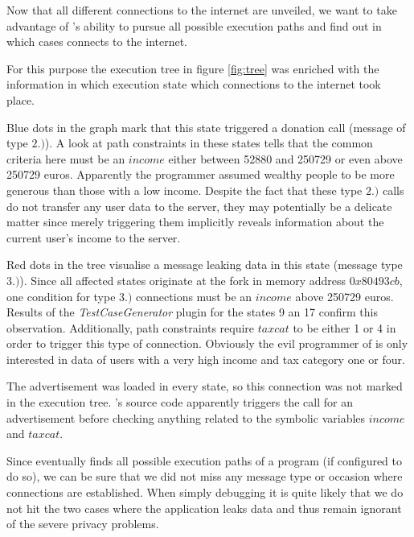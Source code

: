 \medskip

Now that all different connections to the internet are unveiled, we want to take advantage of \sse's ability to pursue all possible execution paths and find out in which cases \app connects to the internet.

For this purpose the execution tree in figure \ref{fig:tree} was enriched with the information in which execution state which connections to the internet took place.

Blue dots in the graph mark that this state triggered a donation call (message of type $2.)$).
A look at path constraints in these states tells that the common criteria here must be an $income$ either between 52880 and 250729 or even above 250729 euros.
Apparently the programmer assumed wealthy people to be more generous than those with a low income.
Despite the fact that these type $2.)$ calls do not transfer any user data to the server, they may potentially be a delicate matter since merely triggering them implicitly reveals information about the current user's income to the server.

Red dots in the tree visualise a message leaking data in this state (message type $3.)$).
Since all affected states originate at the fork in memory address $0x80493cb$, one condition for type $3.)$ connections must be an $income$ above 250729 euros.
Results of the \textit{TestCaseGenerator} plugin for the states 9 an 17 confirm this observation.
Additionally, path constraints require $taxcat$ to be either 1 or 4 in order to trigger this type of connection.
Obviously the evil programmer of \app is only interested in data of users with a very high income and tax category one or four.

The advertisement was loaded in every state, so this connection was not marked in the execution tree.
\app's source code apparently triggers the call for an advertisement before checking anything related to the symbolic variables $income$ and $taxcat$.



Since \sse eventually finds all possible execution paths of a program (if configured to do so), we can be sure that we did not miss any message type or occasion where connections are established.
When simply debugging \app it is quite likely that we do not hit the two cases where the application leaks data and thus remain ignorant of the severe privacy problems.


\medskip

